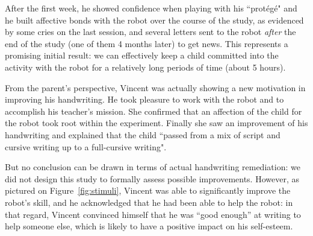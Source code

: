 \documentclass{sig-alternate}
\begin{document}
After the first week, he showed
confidence when playing with his ``prot\'eg\'e" and he built affective bonds with the robot
over the course of the study, as evidenced by some cries on the last session,
and several letters sent to the robot \emph{after} the end of the study
(one of them 4 months later) to get news. This represents a promising initial
result: we can effectively keep a child committed into the activity with the robot for a relatively
long periods of time (about 5 hours).

From the parent's perspective, Vincent was actually showing a new motivation in improving his handwriting. He took pleasure to work with the robot and to accomplish his teacher's mission. She confirmed that an affection of the child for the robot took root within the experiment. Finally she saw an improvement of his handwriting and explained that the child ``passed from a mix of script and cursive writing up to a full-cursive writing".

But no conclusion can be drawn in terms of actual handwriting remediation: we did
not design this study to formally assess possible improvements. However, as pictured on Figure~\ref{fig:stimuli}, Vincent was able to
significantly improve the robot's skill, and he acknowledged that he had been
able to help the robot: in that regard, Vincent convinced himself that he was
``good enough'' at writing to help someone else, which is likely to have
a positive impact on his self-esteem.
\end{document}

